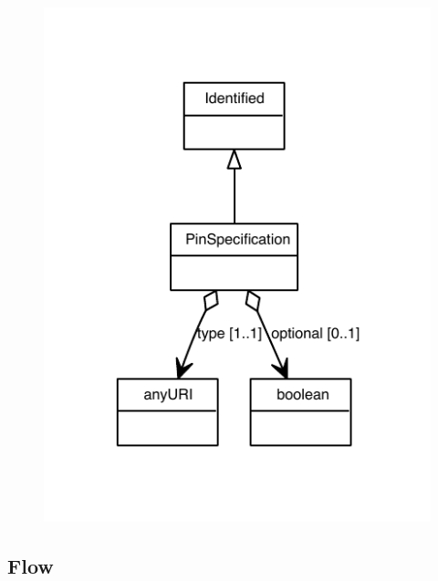 \begin{figure}[ht]
\begin{center}
\includegraphics[scale=0.8]{uml/PinSpecification_abstraction_hierarchy.pdf}
\end{center}
\end{figure}

\subsection{Flow}
\label{sec:Flow}


